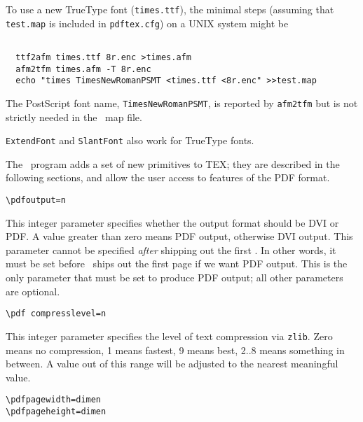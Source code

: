 To use a new TrueType font (\verb|times.ttf|), the minimal steps (assuming that 
\verb|test.map| is included in \verb|pdftex.cfg|) on a UNIX system might be 

\begin{verbatim}

  ttf2afm times.ttf 8r.enc >times.afm 
  afm2tfm times.afm -T 8r.enc 
  echo "times TimesNewRomanPSMT <times.ttf <8r.enc" >>test.map 

\end{verbatim}

The PostScript font name, \verb|TimesNewRomanPSMT|, is reported by \verb|afm2tfm| 
but is not strictly needed in the \pdfTEX\  map file. 

\verb|ExtendFont| and \verb|SlantFont| also work for TrueType fonts. 


The \pdfTEX\  program adds a set of new primitives to TEX; they are described in the 
following sections, and allow the user access to features of the PDF format. 

 
 

\begin{verbatim}
\pdfoutput=n 
\end{verbatim}

This integer parameter specifies whether the output format should be DVI
or PDF.  A value greater than zero means PDF output, otherwise DVI
output. This parameter cannot be specified \emph{after} shipping out the first
. In other words, it must be set before \pdfTEX\  ships out the
first page if we want PDF output. This is the only parameter that must
be set to produce PDF output; all other parameters are optional. 

\begin{verbatim}
\pdf compresslevel=n 
\end{verbatim}

This integer parameter specifies the level of text compression via \verb|zlib|. Zero means 
no compression, 1 means fastest, 9 means best, 2..8 means something in between. 
A value out of this range will be adjusted to the nearest meaningful value. 

\begin{verbatim}
\pdfpagewidth=dimen 
\pdfpageheight=dimen 
\end{verbatim}

